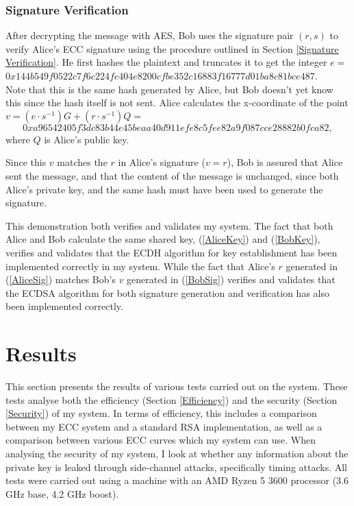 \documentclass[12pt,a4paper]{article}
\begin{document}
\subsubsection{Signature Verification} \noindent \label{Example4}
After decrypting the message with AES, Bob uses the signature pair $(r,s)$ to verify Alice's ECC signature 
using the procedure outlined in Section \ref{Signature Verification}. 
He first hashes the plaintext and truncates it to get the integer $e =$ \\
{\footnotesize$0x144b549f0522c7f6c224fe404e8200cfbe352c16883f16777d01ba8c81bce487$}. \\
Note that this is the same hash generated by Alice, but Bob doesn't yet know this since the hash itself is not sent. 
Alice calculates the x-coordinate of the point $v = (e \cdot s^{-1})G + (r \cdot s^{-1})Q =$ \\
\begin{equation} \label{BobSig}
    0xa96542405f3dc83b44e45beaa40d911efe8c5fee82a9f087cce28882b0fca82,
\end{equation}
where $Q$ is Alice's public key. 

Since this $v$ matches the $r$ in Alice's signature ($v=r$), 
Bob is assured that Alice sent the message, and that the content of the message is unchanged, 
since both Alice's private key, and the same hash must have been used to generate the signature. 

\vspace{5mm}

This demonstration both verifies and validates my system. 
The fact that both Alice and Bob calculate the same shared key, (\ref{AliceKey}) and (\ref{BobKey}), 
verifies and validates that the ECDH algorithm for key establishment has been implemented correctly in my system. 
While the fact that Alice's $r$ generated in (\ref{AliceSig}) matches Bob's $v$ generated in (\ref{BobSig}) 
verifies and validates that the ECDSA algorithm for both signature generation and verification has also been implemented correctly. 



\section{Results} \noindent \label{Results}
This section presents the results of various tests carried out on the system. 
These tests analyse both the efficiency (Section \ref{Efficiency}) and the security (Section \ref{Security}) of my system. 
In terms of efficiency, this includes a comparison between my ECC system and a standard RSA implementation, 
as well as a comparison between various ECC curves which my system can use. 
When analysing the security of my system, I look at whether any information about the private key is leaked through side-channel attacks, 
specifically timing attacks. 
All tests were carried out using a machine with an AMD Ryzen 5 3600 processor (3.6 GHz base, 4.2 GHz boost). 
\end{document}
